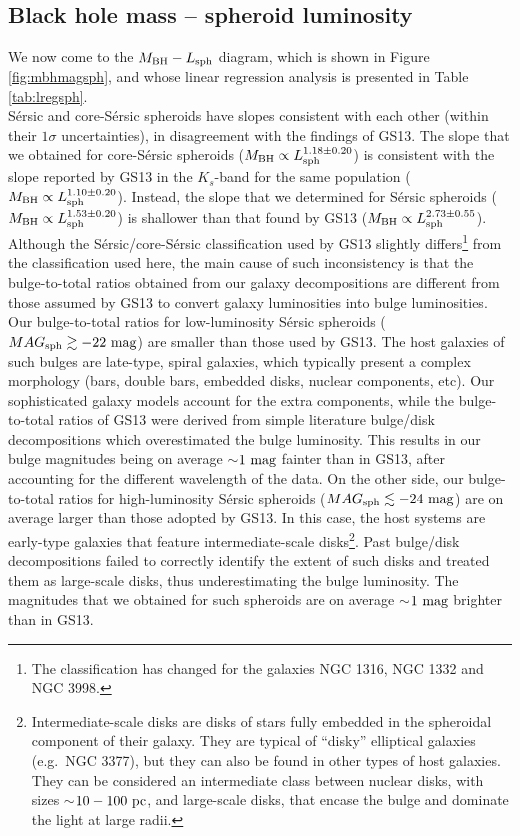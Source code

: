 \documentclass[preprint2]{emulateapj}
\begin{document}
\subsection{Black hole mass -- spheroid luminosity}
We now come to the $M_{\rm BH} - L_{\rm sph}$ diagram, which is shown in Figure \ref{fig:mbhmagsph}, 
and whose linear regression analysis is presented in Table \ref{tab:lregsph}. \\
S\'ersic and core-S\'ersic spheroids have slopes consistent with each other (within their $1\sigma$ uncertainties), 
in disagreement with the findings of GS13. 
The slope that we obtained for core-S\'ersic spheroids ($M_{\rm BH} \propto L_{\rm sph}^{1.18 \pm 0.20}$) 
is consistent with the slope reported by GS13 in the $K_s$-band for the same population ($M_{\rm BH} \propto L_{\rm sph}^{1.10 \pm 0.20}$). 
Instead, the slope that we determined for S\'ersic spheroids ($M_{\rm BH} \propto L_{\rm sph}^{1.53 \pm 0.20}$) 
is shallower than that found by GS13 ($M_{\rm BH} \propto L_{\rm sph}^{2.73 \pm 0.55}$). 
Although the S\'ersic/core-S\'ersic classification used by GS13 slightly differs\footnote{The classification has changed for the galaxies 
NGC 1316, NGC 1332 and NGC 3998.} from the classification used here, 
the main cause of such inconsistency is that the bulge-to-total ratios obtained from our galaxy decompositions 
are different from those assumed by GS13 to convert galaxy luminosities into bulge luminosities.
Our bulge-to-total ratios for low-luminosity S\'ersic spheroids ($MAG_{\rm sph} \gtrsim -22 \rm~mag$) 
are smaller than those used by GS13. 
The host galaxies of such bulges are late-type, spiral galaxies, 
which typically present a complex morphology (bars, double bars, embedded disks, nuclear components, etc).
Our sophisticated galaxy models account for the extra components, 
while the bulge-to-total ratios of GS13 were derived from simple literature bulge/disk decompositions 
which overestimated the bulge luminosity.
This results in our bulge magnitudes being on average $\sim$$1\rm~mag$ fainter than in GS13, after accounting for the different wavelength of the data.
On the other side, our bulge-to-total ratios for high-luminosity S\'ersic spheroids ($MAG_{\rm sph} \lesssim -24 \rm~mag$) 
are on average larger than those adopted by GS13.
In this case, the host systems are early-type galaxies that feature intermediate-scale disks\footnote{Intermediate-scale disks are 
disks of stars fully embedded in the spheroidal component of their galaxy. 
They are typical of ``disky'' elliptical galaxies (e.g.~NGC 3377), 
but they can also be found in other types of host galaxies.
They can be considered an intermediate class between nuclear disks, with sizes $\sim$$10-100\rm~pc$, %
and large-scale disks, that encase the bulge and dominate the light at large radii.}. 
Past bulge/disk decompositions failed to correctly identify the extent of such disks and treated them as large-scale disks, 
thus underestimating the bulge luminosity.
The magnitudes that we obtained for such spheroids are on average $\sim$$1\rm~mag$ brighter than in GS13. 
\end{document}
